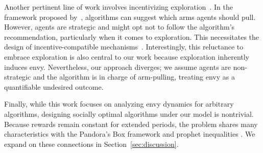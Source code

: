 Another pertinent line of work involves incentivizing exploration~\cite{Kremer14,bahar2020fiduciary,frazier2014incentivizing, Mansour15,simchowitz2024exploration}.
In the framework proposed by~\cite{Kremer14}, algorithms can suggest which arms agents should pull. However, agents are strategic and might opt not to follow the algorithm's recommendation, particularly when it comes to exploration.
This necessitates the design of incentive-compatible mechanisms~\cite{Roughgarden10}. Interestingly, this reluctance to embrace exploration is also central to our work because exploration inherently induces envy. Nevertheless, our approach diverges; we assume agents are non-strategic and the algorithm is in charge of arm-pulling, treating envy as a quantifiable undesired outcome.


Finally, while this work focuses on analyzing envy dynamics for arbitrary algorithms, designing socially optimal algorithms under our model is nontrivial. Because rewards remain constant for extended periods, the problem shares many characteristics with the Pandora’s Box framework \cite{weitzman1978optimal,boodaghians2020pandora,berger2023pandora,amanatidis2024pandora} and prophet inequalities \cite{agrawal2020optimal,brustle2024competition}. We expand on these connections in Section~\ref{sec:discussion}.




